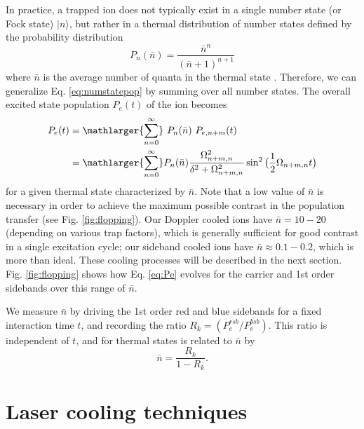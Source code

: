 In practice, a trapped ion does not typically exist in a single number state (or Fock state) $| n \rangle$, but rather in a thermal distribution of number states defined by the probability distribution 
\begin{equation}
P_n (\bar{n}) = \frac{\bar{n}^n}{(\bar{n} + 1)^{n+1}}
\label{eq:Pn}
\end{equation}
where $\bar{n}$ is the average number of quanta in the thermal state \cite{Leibfried03.RMP.75.281}. Therefore, we can generalize Eq. \ref{eq:numstatepop} by summing over all number states. The overall excited state population $P_e (t)$ of the ion becomes 
\begin{equation}
\begin{split}
P_e (t) &= \mathlarger{\sum_{n=0}^{\infty}} \ P_n (\bar{n}) \ P_{e,n+m} (t) \\ 
&= \mathlarger{\sum_{n=0}^{\infty}} P_n (\bar{n}) \frac{ \Omega_{n+m, n}^2 }{ \delta^2 + \Omega_{n+m, n}^2 } \sin^2 \big( \frac{1}{2} \Omega_{n+m, n} t \big)
\label{eq:Pe}
\end{split}
\end{equation}
for a given thermal state characterized by $\bar{n}$. Note that a low value of $\bar{n}$ is necessary in order to achieve the maximum possible contrast in the population transfer (see Fig. \ref{fig:flopping}). Our Doppler cooled ions have $\bar{n} = 10-20$ (depending on various trap factors), which is generally sufficient for good contrast in a single excitation cycle; our sideband cooled ions have $\bar{n} \approx 0.1-0.2$, which is more than ideal. These cooling processes will be described in the next section. Fig. \ref{fig:flopping} shows how Eq. \ref{eq:Pe} evolves for the carrier and 1st order sidebands over this range of $\bar{n}$.


We measure $\bar{n}$ by driving the 1st order red and blue sidebands for a fixed interaction time $t$, and recording the ratio $R_k = (P_e^{rsb} / P_e^{bsb})$. This ratio is independent of $t$, and for thermal states is related to $\bar{n}$ by \cite{Turchette.PRA.61.063418}
\begin{equation}
\bar{n} = \frac{R_k}{1 - R_k} \text{.}
\label{eq:nbar}
\end{equation} 





\section{Laser cooling techniques} 

